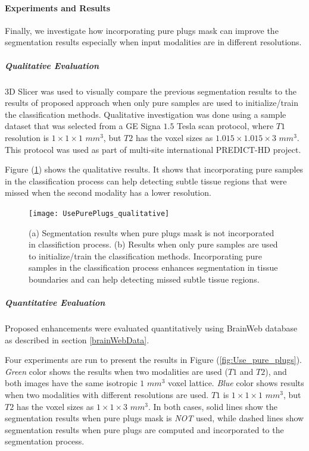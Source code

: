 \paragraph{Experiments and Results}

Finally, we investigate how incorporating pure plugs mask can improve the segmentation results especially when input modalities are in different resolutions.

\subparagraph{Qualitative Evaluation} %

3D Slicer \cite{slicer_paper} was used to visually compare the previous segmentation results to the results of proposed approach when only pure samples are used to initialize/train the classification methods.
Qualitative investigation was done using a sample dataset that was selected from a GE Signa $1.5$ Tesla scan protocol, where $T1$ resolution is $1 \times 1 \times 1$ $mm^3$, but $T2$ has the voxel sizes as $1.015 \times 1.015 \times 3$ $mm^3$.
This protocol was used as part of multi-site international PREDICT-HD \cite{PREDICTHD} project.

Figure (\ref{fig:UsePurePlugs_qualitative}) shows the qualitative results. It shows that incorporating pure samples in the classification process can help detecting subtle tissue regions that were missed when the second modality has a lower resolution.

\begin{figure}
\centering
\texttt{[image: UsePurePlugs\_qualitative]}\
\centering
\caption{(a) Segmentation results when pure plugs mask is not incorporated in classifiction process. (b) Results when only pure samples are used to initialize/train the classification methods. Incorporating pure samples in the classification process enhances segmentation in tissue boundaries and can help detecting missed subtle tissue regions.}
\label{fig:UsePurePlugs_qualitative}
\end{figure}

\subparagraph{Quantitative Evaluation} %

Proposed enhancements were evaluated quantitatively using BrainWeb database as described in section \ref{brainWebData}.

Four experiments are run to present the results in Figure (\ref{fig:Use_pure_plugs}). \textit{Green} color shows the results when two modalities are used ($T1$ and $T2$), and both images have the same isotropic $1$ $mm^3$ voxel lattice.
\textit{Blue} color shows results when two modalities with different resolutions are used. $T1$ is $1 \times 1 \times 1$ $mm^3$, but $T2$ has the voxel sizes as $1 \times 1 \times 3$ $mm^3$.
In both cases, solid lines show the segmentation results when pure plugs mask is \textit{NOT} used, while dashed lines show segmentation results when pure plugs are computed and incorporated to the segmentation process.

